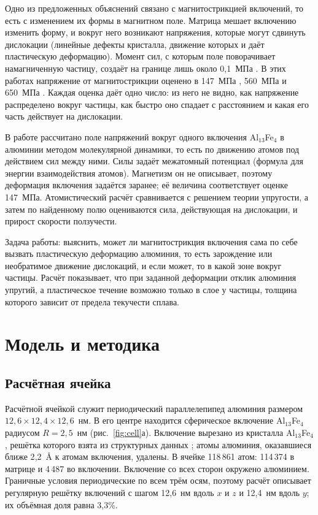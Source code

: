 \documentclass[11pt,a4paper]{article}
\begin{document}
Одно из предложенных объяснений связано с магнитострикцией включений,
то есть с изменением их формы в магнитном поле. Матрица мешает
включению изменить форму, и вокруг него возникают напряжения, которые
могут сдвинуть дислокации (линейные дефекты кристалла, движение которых
и даёт пластическую деформацию). Момент сил, с которым поле поворачивает
намагниченную частицу, создаёт на границе лишь около 0{,}1~МПа
\cite{Skvortsov2019JAP}. В этих работах напряжение от магнитострикции оценено
в 147~МПа \cite{Friha2024JMMM}, 560~МПа \cite{Skvortsov2019JAP}
и 650~МПа \cite{Friha2023PSS}. Каждая оценка даёт одно число: из него не
видно, как напряжение распределено вокруг частицы, как быстро оно спадает
с расстоянием и какая его часть действует на дислокации.

В работе рассчитано поле напряжений вокруг одного включения
Al$_{13}$Fe$_4$ в алюминии методом молекулярной динамики, то есть по
движению атомов под действием сил между ними. Силы задаёт межатомный
потенциал (формула для энергии взаимодействия атомов). Магнетизм он не
описывает, поэтому деформация включения задаётся заранее; её величина
соответствует оценке 147~МПа. Атомистический расчёт сравнивается
с решением теории упругости, а затем по найденному полю оцениваются
сила, действующая на дислокации, и прирост скорости ползучести.

Задача работы: выяснить, может ли магнитострикция включения сама по себе
вызвать пластическую деформацию алюминия, то есть зарождение или
необратимое движение дислокаций, и если может, то в какой зоне вокруг
частицы. Расчёт показывает, что при заданной деформации отклик алюминия
упругий, а пластическое течение возможно только в слое у частицы,
толщина которого зависит от предела текучести сплава.

\section{Модель и методика}

\subsection{Расчётная ячейка}

Расчётной ячейкой служит периодический параллелепипед
алюминия размером $12{,}6\times12{,}4\times12{,}6$~нм. В его центре
находится сферическое включение Al$_{13}$Fe$_4$ радиусом $R=2{,}5$~нм
(рис.~\ref{fig:cell}а). Включение вырезано из кристалла Al$_{13}$Fe$_4$,
решётка которого взята из структурных данных \cite{Liu2024CIF}; атомы алюминия,
оказавшиеся ближе 2{,}2~\AA{} к атомам включения, удалены. В ячейке
118\,861 атом: 114\,374 в матрице и 4\,487 во включении. Включение
со всех сторон окружено алюминием. Граничные условия
периодические по всем трём осям, поэтому расчёт описывает
регулярную решётку включений с шагом 12{,}6~нм вдоль $x$ и $z$ и 12{,}4~нм вдоль $y$; их объёмная доля
равна 3{,}3\%.
\end{document}
